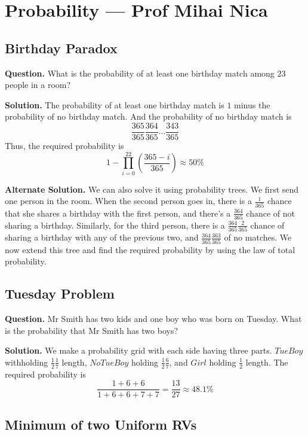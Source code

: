 
\section{Probability --- Prof Mihai Nica}
\subsection{Birthday Paradox}

\textbf{Question.} What is the probability of at least one birthday match among $23$ people in a room?

\textbf{Solution.} The probability of at least one birthday match is $1$ minus the probability of no birthday match. And the probability of no birthday match is 
\[\frac{365}{365} \frac{364}{365} \dots \frac{343}{365}\]
Thus, the required probability is 
\[1 - \prod_{i = 0}^{22} \left(\frac{365-i}{365}\right) \approx 50\%\]

\textbf{Alternate Solution.} We can also solve it using probability trees. We first send one person in the room. When the second person goes in, there is a $\frac{1}{365}$ chance that she shares a birthday with the first person, and there's a $\frac{364}{365}$ chance of not sharing a birthday. Similarly, for the third person, there is a $\frac{364}{365} \frac{2}{365}$ chance of sharing a birthday with any of the previous two, and $\frac{364}{365} \frac{363}{365}$ of no matches. We now extend this tree and find the required probability by using the law of total probability.

\subsection{Tuesday Problem}

\textbf{Question.} Mr Smith has two kids and one boy who was born on Tuesday. What is the probability that Mr Smith has two boys?

\textbf{Solution.} We make a probability grid with each side having three parts. $TueBoy$ withholding $\frac{1}{2} \frac{1}{7}$ length, $NoTueBoy$ holding $\frac{1}{2} \frac{6}{7}$, and $Girl$ holding $\frac{1}{2}$ length. The required probability is 
\[\frac{1 + 6 + 6}{ 1 + 6 + 6 + 7 + 7} = \frac{13}{27} \approx 48.1\%\]

\subsection{Minimum of two Uniform RVs}

